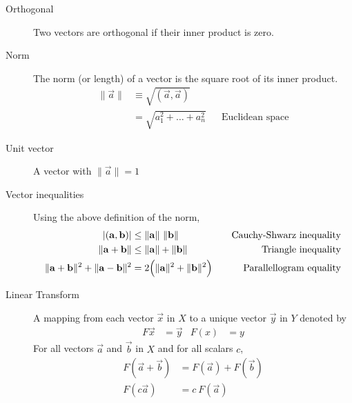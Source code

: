\begin{description}
    \item[Orthogonal] Two vectors are orthogonal if their inner product is zero.
    \item[Norm] The norm (or length) of a vector is the square root of its inner product.
        \begin{align}
            \lVert \vec{a} \rVert & \equiv \sqrt{(\vec{a}, \vec{a})}   \\
                                  & = \sqrt{a_1^2 + \dots + a_n^2}   &
                                  & \text{Euclidean space}
        \end{align}
    \item[Unit vector] A vector with $ \lVert \vec{a} \rVert = 1 $

    \item[Vector inequalities] Using the above definition of the norm,
        \begin{align}
            \left\lvert  (\mathbf{a}, \mathbf{b})  \right\rvert                                &
            \leq \lVert \mathbf{a} \rVert\ \lVert \mathbf{b} \rVert               &
                                                                            &   &
            \text{Cauchy-Shwarz inequality}                                       \\
            \lVert \mathbf{a} + \mathbf{b} \rVert                                 &
            \leq \lVert \mathbf{a} \rVert + \lVert \mathbf{b} \rVert              &
                                                                            &   &
            \text{Triangle inequality}                                            \\
            \lVert \mathbf{a} + \mathbf{b} \rVert^2
            + \lVert \mathbf{a} - \mathbf{b} \rVert^2                             &
            = 2\Big(\lVert \mathbf{a} \rVert^2 + \lVert \mathbf{b} \rVert^2 \Big) &
                                                                            &   &
            \text{Parallellogram equality}
        \end{align}

    \item[Linear Transform] A mapping from each vector $ \vec{x} $ in $ X $ to a
        unique vector $ \vec{y} $ in $ Y $ denoted by
        \begin{align}
            F\vec{x} & = \vec{y} & F(x) & = y
        \end{align}
        For all vectors $ \vec{a} $ and $ \vec{b} $ in $ X $ and for all scalars $ c $,
        \begin{align}
            F(\vec{a} + \vec{b}) & = F(\vec{a}) + F(\vec{b}) \\
            F(c\vec{a})          & = c\ F(\vec{a})
        \end{align}


\end{description}
